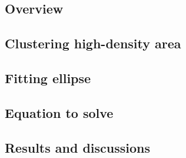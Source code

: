 \subsection{Overview}


\subsection{Clustering high-density area}


\subsection{Fitting ellipse}


\subsection{Equation to solve}


\subsection{Results and discussions}
